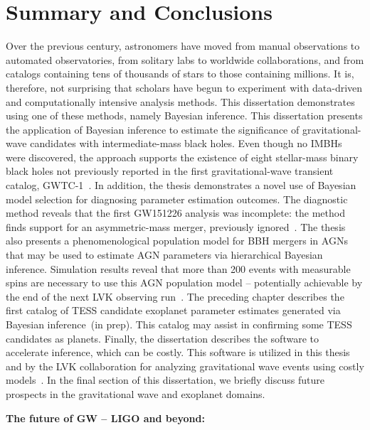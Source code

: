 \chapter{Summary and Conclusions}
\label{cp.conc}

Over the previous century, astronomers have moved from manual observations to automated observatories, from solitary labs to worldwide collaborations, and from catalogs containing tens of thousands of stars to those containing millions. 
It is, therefore, not surprising that scholars have begun to experiment with data-driven and computationally intensive analysis methods. 
This dissertation demonstrates using one of these methods, namely Bayesian inference. 
This dissertation presents the application of Bayesian inference to estimate the significance of gravitational-wave candidates with intermediate-mass black holes. 
Even though no IMBHs were discovered, the approach supports the existence of eight stellar-mass binary black holes not previously reported in the first gravitational-wave transient catalog, GWTC-1~\cite{bcr_imbh_search}. 
In addition, the thesis demonstrates a novel use of Bayesian model selection for diagnosing parameter estimation outcomes. 
The diagnostic method reveals that the first GW151226 analysis was incomplete: the method finds support for an asymmetric-mass merger, previously ignored~\cite{deep_followup}. 
The thesis also presents a phenomenological population model for BBH mergers in AGNs that may be used to estimate AGN parameters via hierarchical Bayesian inference. 
Simulation results reveal that more than 200 events with measurable spins are necessary to use this AGN population model -- potentially achievable by the end of the next LVK observing run~\cite{bbh_in_agn}. 
The preceding chapter describes the first catalog of TESS candidate exoplanet parameter estimates generated via Bayesian inference~(in prep). 
This catalog may assist in confirming some TESS candidates as planets. 
Finally, the dissertation describes the software to accelerate inference, which can be costly. 
This software is utilized in this thesis and by the LVK collaboration for analyzing gravitational wave events using costly models~\cite{pbilby}.
In the final section of this dissertation, we briefly discuss future prospects in the gravitational wave and exoplanet domains. 

\textbf{The future of GW -- LIGO and beyond:}

